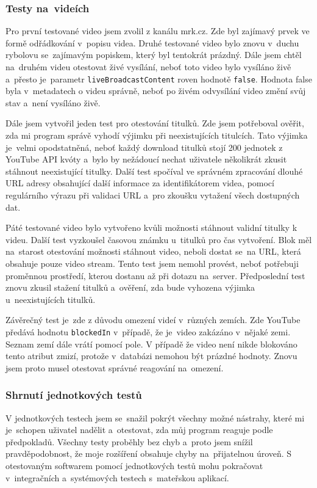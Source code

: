 \subsubsection{Testy na~videích}
\par Pro první testované video jsem zvolil  z kanálu mrk.cz. Zde byl zajímavý prvek ve formě odřádkování v~popisu videa. Druhé testované video bylo znovu v~duchu rybolovu se~zajímavým popiskem, který byl tentokrát prázdný. Dále jsem chtěl na~druhém videu otestovat živé vysílání, neboť toto video bylo vysíláno živě a~přesto je~parametr \texttt{liveBroadcastContent} roven hodnotě \texttt{false}. Hodnota false byla v~metadatech o videu správně, neboť po živém odvysílání video změní svůj stav a~není vysíláno živě.
\par Dále jsem vytvořil jeden test pro otestování titulků. Zde jsem potřeboval ověřit, zda mi program správě vyhodí výjimku při neexistujících titulcích. Tato výjimka je~velmi opodstatněná, neboť každý download titulků stojí 200 jednotek z YouTube API kvóty a~bylo by nežádoucí nechat uživatele několikrát zkusit stáhnout neexistující titulky. Další test spočíval ve správném zpracování dlouhé URL adresy  obsahující další informace za identifikátorem videa, pomocí regulárního výrazu při validaci URL a~pro zkoušku vytažení všech dostupných dat.
\par Páté testované video bylo vytvořeno kvůli možnosti stáhnout validní titulky k videu. Další test vyzkoušel časovou známku u~titulků pro čas vytvoření. Blok  měl na~starost otestování možnosti stáhnout video, neboli dostat se~na URL, která obsahuje pouze video stream. Tento test jsem nemohl provést, neboť potřebuji proměnnou prostředí, kterou dostanu až při dotazu na~server. Předposlední test znovu zkusil stažení titulků a~ověření, zda bude vyhozena výjimka u~neexistujících titulků.
\par Závěrečný test je~zde z důvodu omezení videí v~různých zemích. Zde YouTube předává hodnotu \texttt{blockedIn} v~případě, že je~video zakázáno v~nějaké zemi. Seznam zemí dále vrátí pomocí pole. V případě že video není nikde blokováno tento atribut zmizí, protože v~databázi nemohou být prázdné hodnoty. Znovu jsem proto musel otestovat správné reagování na~omezení.
\subsubsection{Shrnutí jednotkových testů}
\par V jednotkových testech jsem se~snažil pokrýt všechny možné nástrahy, které mi je~schopen uživatel nadělit a~otestovat, zda můj program reaguje podle předpokladů. Všechny testy proběhly bez chyb a~proto jsem snížil pravděpodobnost, že moje rozšíření obsahuje chyby na~přijatelnou úroveň. S otestovaným softwarem pomocí jednotkových testů mohu pokračovat v~integračních a~systémových testech s~mateřskou aplikací.
